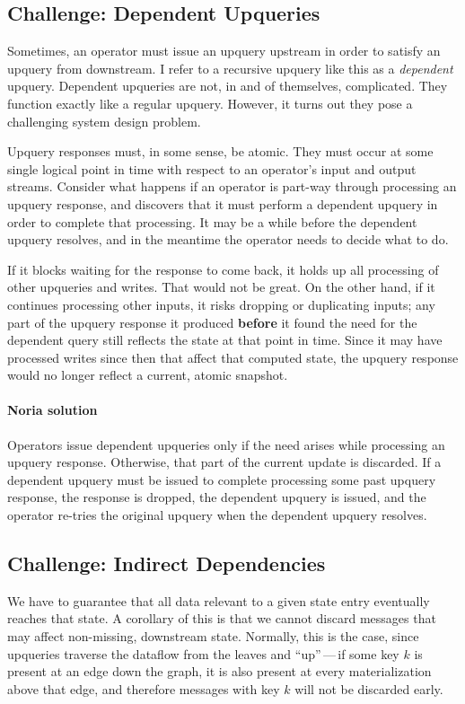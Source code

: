 \subsection{Challenge: Dependent Upqueries}

Sometimes, an operator must issue an upquery upstream in order to
satisfy an upquery from downstream. I refer to a recursive upquery like
this as a \emph{dependent} upquery. Dependent upqueries are not, in and of
themselves, complicated. They function exactly like a regular upquery.
However, it turns out they pose a challenging system design problem.

Upquery responses must, in some sense, be atomic. They must occur at
some single logical point in time with respect to an operator's input
and output streams. Consider what happens if an operator is part-way
through processing an upquery response, and discovers that it must
perform a dependent upquery in order to complete that processing. It may
be a while before the dependent upquery resolves, and in the meantime
the operator needs to decide what to do.

If it blocks waiting for the response to come back, it holds up all
processing of other upqueries and writes. That would not be great. On
the other hand, if it continues processing other inputs, it risks
dropping or duplicating inputs; any part of the upquery response it
produced \textbf{before} it found the need for the dependent query still
reflects the state at that point in time. Since it may have processed
writes since then that affect that computed state, the upquery response
would no longer reflect a current, atomic snapshot.

\paragraph{Noria solution}
Operators issue dependent upqueries only if the need arises while processing an
upquery response. Otherwise, that part of the current update is discarded. If a
dependent upquery must be issued to complete processing some past upquery
response, the response is dropped, the dependent upquery is issued, and the
operator re-tries the original upquery when the dependent upquery resolves.

\subsection{Challenge: Indirect Dependencies}

We have to guarantee that all data relevant to a given state entry
eventually reaches that state. A corollary of this is that we cannot
discard messages that may affect non-missing, downstream state.
Normally, this is the case, since upqueries traverse the dataflow from
the leaves and ``up''\,---\,if some key $k$ is present at an edge down the
graph, it is also present at every materialization above that edge, and
therefore messages with key $k$ will not be discarded early.

